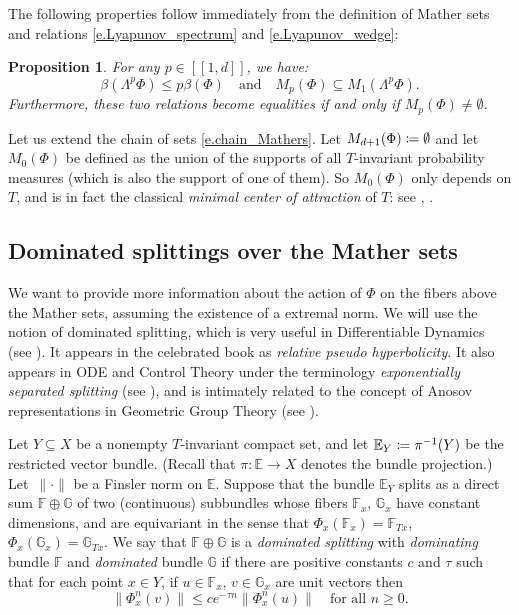 \documentclass[JEP,XML,SOM,Unicode]{cedram}
\newcommand{\ldbrack}{[\![}
\newcommand{\rdbrack}{]\!]}
\def\vcentcolon{\mathrel{\mathop\ordinarycolon}}
\providecommand\ordinarycolon{:}
\providecommand*\coloneqq{\vcentcolon\mathrel{\mkern-1.2mu}=}
\theoremstyle{plain}
\newtheorem{proposition}[theorem]{Proposition}
\theoremstyle{definition}
\newcommand{\EE}{\mathbb{E}}
\newcommand{\FF}{\mathbb{F}}
\newcommand{\GG}{\mathbb{G}}
\newcommand{\WEDGE}{\mathsf{\Lambda}}
\begin{document}
The following properties follow immediately from the definition of Mather sets and relations \eqref{e.Lyapunov_spectrum} and \eqref{e.Lyapunov_wedge}:

\begin{proposition}\label{p.Mathers}
For any $p \in \ldbrack 1,d \rdbrack$, we have:
\[
\beta(\WEDGE^p \Phi) \le p \beta(\Phi)
\quad \text{and} \quad
M_p(\Phi)\subseteq M_1(\WEDGE^p \Phi).
\]
Furthermore, these two relations become equalities if and only if $M_p(\Phi) \neq \emptyset$.
\end{proposition}

Let us extend the chain of sets \eqref{e.chain_Mathers}.
Let $M_{d+1}(\Phi) \coloneqq \emptyset$
and let $M_0(\Phi)$ be defined as the union of the supports of all $T$-invariant probability measures (which is also the support of one of them). So $M_0(\Phi)$ only depends on $T$, and is in fact the classical \emph{minimal center of attraction} of $T$: see \cite{Sigmund}, \cite[p.\,164]{Akin}.

\subsection{Dominated splittings over the Mather sets}\label{ss.Mather_dom}

We want to provide more infor\-mation about the action of $\Phi$ on the fibers above the Mather sets, assuming the existence of a extremal norm.
We will use the notion of dominated splitting, which is very useful in Differentiable Dynamics (see \cite{BDV_book}).
It appears in the celebrated book \cite{HPS} as \emph{relative pseudo hyperbolicity}.
It also appears in ODE and Control Theory under the terminology \emph{exponentially separated splitting} (see \cite{CK_book}), and is intimately related to the concept of Anosov representations in Geometric Group Theory (see \cite{BPS}).

Let $Y \subseteq X$ be a nonempty $T$-invariant compact set, and let $\EE_Y \coloneqq \pi^{-1}(Y)$ be the restricted vector bundle. (Recall that $\pi \colon \EE \to X$ denotes the bundle projection.)
Let~$\| \mathord{\cdot} \|$ be a Finsler norm on $\EE$.
Suppose that the bundle $\EE_Y$ splits as a direct sum $\FF \oplus \GG$ of two (continuous) subbundles whose fibers $\FF_x$, $\GG_x$ have constant dimensions, and are equivariant in the sense that $\Phi_x(\FF_x) = \FF_{Tx}$, $\Phi_x(\GG_x) = \GG_{Tx}$.
We say that $\FF \oplus \GG$ is a \emph{dominated splitting} with \emph{dominating} bundle $\FF$ and \emph{dominated} bundle $\GG$ if there are positive constants $c$ and $\tau$ such that for each point $x \in Y$, if $u \in \FF_x$, $v \in \GG_x$ are unit vectors then
\begin{equation}\label{e.def_DS}
\| \Phi_x^n(v) \| \le c e^{-\tau n} \| \Phi_x^n(u) \| \quad \text{for all } n \ge 0.
\end{equation}
\end{document}
